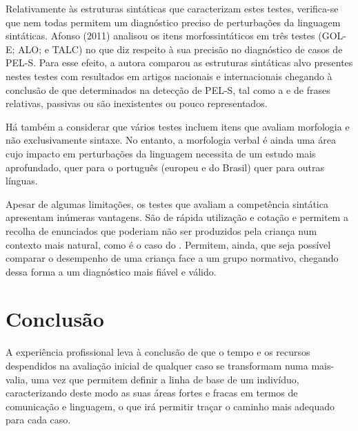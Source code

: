 \documentclass[output=paper]{LSP/langsci}
\begin{document}
Relativamente às estruturas sintáticas que caracterizam estes testes, verifica-se que nem todas permitem um diagnóstico preciso de perturbações da linguagem sintáticas. Afonso (2011) analisou os itens morfossintáticos em três testes (GOL-E; ALO; e TALC) no que diz respeito à sua precisão no diagnóstico de casos de PEL-S. Para esse efeito, a autora comparou as estruturas sintáticas alvo presentes nestes testes com resultados em artigos nacionais e internacionais chegando à conclusão de que determinados  na detecção de PEL-S, tal como a  e  de frases relativas, passivas ou  são inexistentes ou pouco representados. 

Há também a considerar que vários testes incluem itens que avaliam morfologia e não exclusivamente sintaxe. No entanto, a morfologia verbal é ainda uma área cujo impacto em perturbações da linguagem necessita de um estudo mais aprofundado, quer para o português (europeu e do Brasil) quer para outras línguas. 

Apesar de algumas limitações, os testes que avaliam a competência sintática apresentam inúmeras vantagens. São de rápida utilização e cotação e permitem a recolha de enunciados que poderiam não ser produzidos pela criança num contexto mais natural, como é o caso do . Permitem, ainda, que seja possível comparar o desempenho de uma criança face a um grupo normativo, chegando dessa forma a um diagnóstico mais fiável e válido.

\section{Conclusão}
\label{sec:martins_conclusao}

A experiência profissional leva à conclusão de que o tempo e os recursos despendidos na avaliação inicial de qualquer caso se transformam numa mais-valia, uma vez que permitem definir a linha de base de um indivíduo, caracterizando deste modo as suas áreas fortes e fracas em termos de comunicação e linguagem, o que irá permitir traçar o caminho mais adequado para cada caso. 
\end{document}
